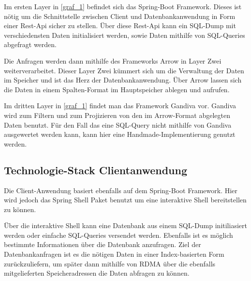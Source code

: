 Im ersten Layer in \ref{graf_1} befindet sich das Spring-Boot Framework.
Dieses ist nötig um die Schnittstelle zwischen Client und Datenbankanwendung in Form einer Rest-Api sicher zu stellen. 
Über diese Rest-Api kann ein SQL-Dump mit verschiedensten Daten initialisiert werden, sowie Daten mithilfe von SQL-Queries abgefragt werden.

Die Anfragen werden dann mithilfe des Frameworks Arrow in Layer Zwei weiterverarbeitet. Dieser Layer Zwei kümmert sich um die Verwaltung der Daten im Speicher und ist das Herz der Datenbankanwendung. Über Arrow lassen sich die Daten in einem Spalten-Format im Hauptspeicher ablegen und aufrufen.

Im dritten Layer in \ref{graf_1} findet man das Framework Gandiva vor. 
Gandiva wird zum Filtern und zum Projizieren von den im Arrow-Format abgelegten Daten benutzt. Für den Fall das eine SQL-Query nicht mithilfe von Gandiva ausgewertet werden kann, kann hier eine Handmade-Implementierung genutzt werden.



\subsection{Technologie-Stack Clientanwendung}

Die Client-Anwendung basiert ebenfalls auf dem Spring-Boot Framework. Hier wird jedoch das Spring Shell Paket benutzt um eine interaktive Shell bereitstellen zu können.

Über die interaktive Shell kann eine Datenbank aus einem SQL-Dump initiliasiert werden oder einfache SQL-Queries versendet werden. Ebenfalls ist es möglich bestimmte Informationen über die Datenbank anzufragen.
Ziel der Datenbankanfragen ist es die nötigen Daten in einer Index-basierten Form zurückzuliefern, um später dann mithilfe von RDMA über die ebenfalls mitgelieferten Speicheradressen die Daten abfragen zu können.




